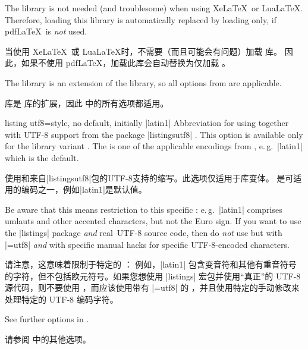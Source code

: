 \begin{marker}
The  library is not needed (and troublesome) when using Xe\LaTeX\ or Lua\LaTeX.
Therefore, loading this library is automatically replaced by loading
 only, if pdf\LaTeX\ is \emph{not} used.

当使用 Xe\LaTeX\ 或 Lua\LaTeX 时，不需要（而且可能会有问题）加载  库。 因此，如果不使用 pdf\LaTeX，加载此库会自动替换为仅加载 。
\end{marker}

The  library is an extension of the
 library, so
all options from  are applicable.

 库是  库的扩展，因此  中的所有选项都适用。
\begin{docTcbKey}{listing utf8}{=}{style, no default, initially |latin1|}
Abbreviation for using 
together with UTF-8 support from the package |listingsutf8| .
This option is available only for the library variant .
The  is one of
the applicable encodings from , e.\,g.\ |latin1|
which is the default.\par


使用和来自|listingsutf8|包的UTF-8支持的缩写。此选项仅适用于库变体。  是可适用的编码之一，例如|latin1|是默认值。

Be aware that this means restriction to this specific :
e.\,g.\ |latin1| comprises umlauts and other accented characters, but not
the Euro sign. If you want to use the |listings| package \emph{and} \flqq real\frqq\
UTF-8 source code, then do \emph{not} use  but 
with
|=utf8|
\emph{and} with specific manual hacks for specific UTF-8-encoded characters.


请注意，这意味着限制于特定的 ： 例如，|latin1| 包含变音符和其他有重音符号的字符，但不包括欧元符号。如果您想使用 |listings| 宏包并使用“真正”的 UTF-8 源代码，则不要使用 ，而应该使用带有 |=utf8| 的 ，并且使用特定的手动修改来处理特定的 UTF-8 编码字符。
\end{docTcbKey}

See further options in .

请参阅  中的其他选项。